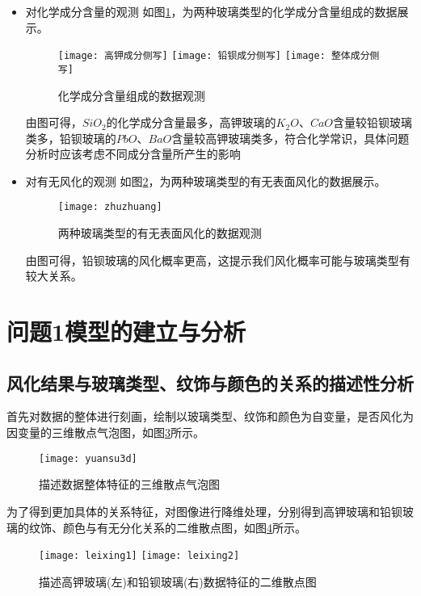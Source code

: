 \documentclass[withoutpreface,bwprint]{cumcmthesis} %
\begin{document}
\begin{itemize}
	\item 对化学成分含量的观测 如图\ref{cexie}，为两种玻璃类型的化学成分含量组成的数据展示。
	
	\begin{figure}[!h]
		\centering
		\texttt{[image: 高钾成分侧写]}
		\texttt{[image: 铅钡成分侧写]}
		\texttt{[image: 整体成分侧写]}
		\caption{化学成分含量组成的数据观测}
		\label{cexie}
	\end{figure}


	由图可得，$SiO_{2}$的化学成分含量最多，高钾玻璃的$K_{2}O$、$CaO$含量较铅钡玻璃类多，铅钡玻璃的$PbO$、$BaO$含量较高钾玻璃类多，符合化学常识，具体问题分析时应该考虑不同成分含量所产生的影响
	
	
	\item 对有无风化的观测 如图\ref{zhuzhuang}，为两种玻璃类型的有无表面风化的数据展示。
	
	\begin{figure}[!h]
		\centering
		\texttt{[image: zhuzhuang]}
		\caption{两种玻璃类型的有无表面风化的数据观测}
		\label{zhuzhuang}
	\end{figure}
	
	由图可得，铅钡玻璃的风化概率更高，这提示我们风化概率可能与玻璃类型有较大关系。
	
	
\end{itemize}


\section{问题1模型的建立与分析}
\subsection{风化结果与玻璃类型、纹饰与颜色的关系的描述性分析}
首先对数据的整体进行刻画，绘制以玻璃类型、纹饰和颜色为自变量，是否风化为因变量的三维散点气泡图，如图\ref{yuansu3d}所示。

\begin{figure}[!h]
	\centering
	\texttt{[image: yuansu3d]}
	\caption{描述数据整体特征的三维散点气泡图}
	\label{yuansu3d}
\end{figure}


为了得到更加具体的关系特征，对图像进行降维处理，分别得到高钾玻璃和铅钡玻璃的纹饰、颜色与有无分化关系的二维散点图，如图\ref{leixing}所示。

\begin{figure}[!h]
	\centering
	\texttt{[image: leixing1]}
	\texttt{[image: leixing2]}
	\caption{描述高钾玻璃(左)和铅钡玻璃(右)数据特征的二维散点图}
	\label{leixing}
\end{figure}
\end{document}
